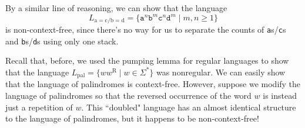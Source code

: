 By a similar line of reasoning, we can show that the language
\begin{equation*}
L_{\text{a}=\text{c}/\text{b}=\text{d}} = \{\texttt{a}^{n}\texttt{b}^{m}\texttt{c}^{n}\texttt{d}^{m} \mid m, n \geq 1\}
\end{equation*}
is non-context-free, since there's no way for us to separate the counts of \texttt{a}s/\texttt{c}s and \texttt{b}s/\texttt{d}s using only one stack.

Recall that, before, we used the pumping lemma for regular languages to show that the language $L_{\text{pal}} = \{ww^{\text{R}} \mid w \in \Sigma^{*}\}$ was nonregular. We can easily show that the language of palindromes is context-free. However, suppose we modify the language of palindromes so that the reversed occurrence of the word $w$ is instead just a repetition of $w$. This ``doubled" language has an almost identical structure to the language of palindromes, but it happens to be non-context-free!

